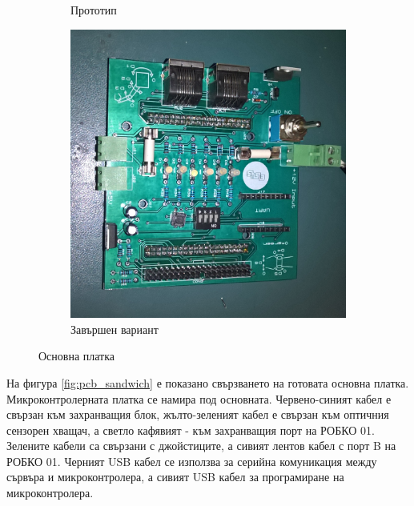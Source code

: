 \begin{figure}[!h]
\begin{subfigure}{0.32\textwidth}
        \caption{Прототип}
        \label{fig:main_board_proto}
    \end{subfigure}
    \hfill%
    \begin{subfigure}{0.32\textwidth}
        \centering
        \includegraphics[width=\linewidth]{pictures/main_board.jpg}
        \caption{Завършен вариант}
        \label{fig:main_board_real}
    \end{subfigure}
    \caption{Основна платка}
    \label{fig:main_board}
\end{figure}
\indent{}
На фигура \ref{fig:pcb_sandwich} е показано свързването на готовата основна платка. Микроконтролерната платка се намира под основната. Червено-синият кабел е свързан към захранващия блок, жълто-зеленият кабел е свързан към оптичния сензорен хващач, а светло кафявият - към захранващия порт на РОБКО 01. Зелените кабели са свързани с джойстиците, а сивият лентов кабел с порт B на РОБКО 01. Черният USB кабел се използва за серийна комуникация между сървъра и микроконтролера, а сивият USB кабел за програмиране на микроконтролера.\\
